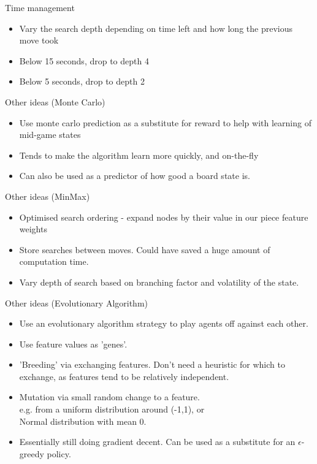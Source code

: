 \documentclass{beamer}
\begin{document}
\begin{frame}{Time management}
    \begin{itemize}
  \item
    Vary the search depth depending on time left and how long the previous move took
  \item
    Below 15 seconds, drop to depth 4
  \item
     Below 5 seconds, drop to depth 2  
  \end{itemize}
\end{frame}

\begin{frame}{Other ideas (Monte Carlo)}
    \begin{itemize}
  \item
    	Use monte carlo prediction as a substitute for reward to help with learning of mid-game states
  \item
	Tends to make the algorithm learn more quickly, and on-the-fly
  \item
	Can also be used as a predictor of how good a board state is.
  \end{itemize}
\end{frame}

\begin{frame}{Other ideas (MinMax)}
    \begin{itemize}
  \item
    Optimised search ordering - expand nodes by their value in our piece feature weights
  \item
	Store searches between moves. Could have saved a huge amount of computation time.
  \item
	Vary depth of search based on branching factor and volatility of the state.
  \end{itemize}
\end{frame}

\begin{frame}{Other ideas (Evolutionary Algorithm)}
    \begin{itemize}
  \item
   	Use an evolutionary algorithm strategy to play agents off against each other.
  \item
	Use feature values as 'genes'.
  \item
	'Breeding' via exchanging features. Don't need a heuristic for which to exchange, as features tend to be relatively independent.
  \item
	Mutation via small random change to a feature.
	\\ e.g. from a uniform distribution around (-1,1), or
	\\ Normal distribution with mean 0.
  \item
	Essentially still doing gradient decent. Can be used as a substitute for an $\epsilon$-greedy policy.
  \end{itemize}
\end{frame}
\end{document}
